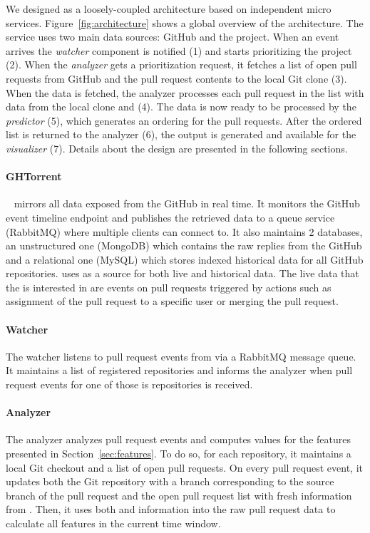 \documentclass[conference]{IEEEtran}
\begin{document}
We designed \prioritizer as a loosely-coupled architecture based on independent
micro services. Figure~\ref{fig:architecture} shows a global overview of the
architecture.  The \prioritizer service uses two main data sources: GitHub and
the \ghtorrent project.  When an event arrives the \emph{watcher} component is
notified (1) and starts prioritizing the project (2).  When the \emph{analyzer}
gets a prioritization request, it fetches a list of open pull requests from
GitHub and the pull request contents to the local Git clone (3).  When the data
is fetched, the analyzer processes each pull request in the list with data from the local
clone and \ghtorrent (4).  The data is now ready to be processed by the
\emph{predictor} (5), which generates an ordering for the pull requests.  After
the ordered list is returned to the analyzer (6), the output is generated and
available for the \emph{visualizer} (7).  Details about the design are presented 
in the following sections.

\paragraph{GHTorrent}
\ghtorrent~\cite{G13} mirrors all data exposed from the GitHub \api in
real time. It monitors the GitHub event timeline \api endpoint and publishes the 
retrieved data to a queue service (RabbitMQ) where multiple clients can connect to. 
It also maintains 2 databases, an unstructured one (MongoDB)
which contains the raw replies from the GitHub \api and a relational one
(MySQL) which stores indexed historical data for all GitHub repositories.
\prioritizer uses \ghtorrent as a source for both live and historical data. The live data
that the \prioritizer is interested in are events on pull requests triggered by actions 
such as assignment of the pull request to a specific user or merging the pull request.

\paragraph{Watcher}
The watcher listens to pull request events from \ghtorrent
via a RabbitMQ message queue. It maintains a list of registered repositories
and informs the analyzer when pull request events for one of those is
repositories is received.

\paragraph{Analyzer}
The analyzer analyzes pull request events and computes values for
the features presented in Section~\ref{sec:features}. To do so, for each repository,
it maintains a local Git checkout and a list of open pull requests.
On every pull request event, it updates both the Git repository with
a branch corresponding to the source branch of the pull request
and the open pull request list with fresh information from \ghtorrent.
Then, it uses both \ghtorrent and information into the raw pull request
data to calculate all features in the current time window.
\end{document}
